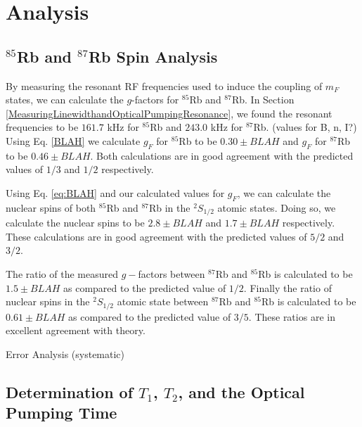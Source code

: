 
\section{Analysis}\label{analysis}

\subsection{$^{85}$Rb and $^{87}$Rb Spin Analysis}\label{SpinAnalysis}

By measuring the resonant RF frequencies used to induce the coupling of $m_F$ states, we can calculate the $g$-factors for $^{85}$Rb and $^{87}$Rb.  In Section \ref{MeasuringLinewidthandOpticalPumpingResonance}, we found the resonant frequencies to be $161.7$ kHz for $^{85}$Rb and $243.0$ kHz for $^{87}$Rb.  (values for B, n, I?) Using Eq. \ref{BLAH} we calculate $g_F$ for $^{85}$Rb to be $0.30\pm BLAH$ and $g_F$ for $^{87}$Rb to be $0.46\pm BLAH$.  Both calculations are in good agreement with the predicted values of $1/3$ and $1/2$ respectively. 

Using Eq. \ref{eq:BLAH} and our calculated values for $g_F$, we can calculate the nuclear spins of both $^{85}$Rb and $^{87}$Rb in the $^{2}S_{1/2}$ atomic states.  Doing so, we calculate the nuclear spins to be $2.8 \pm BLAH$ and $1.7 \pm BLAH$ respectively.  These calculations are in good agreement with the predicted values of $5/2$ and $3/2$.  

The ratio of the measured $g-$factors between $^{87}$Rb and $^{85}$Rb is calculated to be $1.5 \pm BLAH$ as compared to the predicted value of $1/2$.  Finally the ratio of nuclear spins in the $^{2}S_{1/2}$ atomic state between $^{87}$Rb and $^{85}$Rb is calculated to be $0.61\pm BLAH$ as compared to the predicted value of $3/5$.  These ratios are in excellent agreement with theory.

Error Analysis (systematic)

\subsection{Determination of $T_{1}$, $T_{2}$, and the Optical Pumping Time}\label{DeterminationofTimes}

